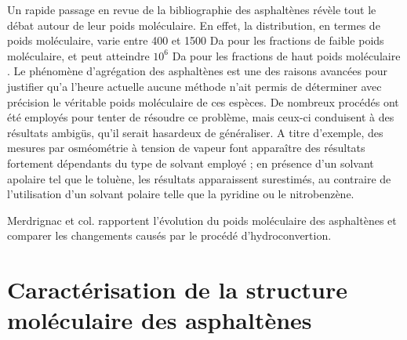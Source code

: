 	Un rapide passage en revue de la bibliographie des asphaltènes révèle tout le débat autour de leur poids moléculaire. En effet, la distribution, en termes de poids moléculaire, varie entre 400 et 1500 Da pour les fractions de faible poids moléculaire, et peut atteindre $10^{6}$ Da pour les fractions de haut poids moléculaire \cite{mullins2008contrasting}. Le phénomène d'agrégation des asphaltènes est une des raisons avancées pour justifier qu'a l'heure actuelle aucune méthode n'ait permis de déterminer avec précision le véritable poids moléculaire de ces espèces. De nombreux procédés ont été employés pour tenter de résoudre ce problème, mais ceux-ci conduisent à des résultats ambigüs, qu'il serait hasardeux de généraliser. A titre d'exemple, des mesures par osméométrie à tension de vapeur font apparaître des résultats fortement dépendants du type de solvant employé ; en présence d'un solvant apolaire tel que le toluène, les résultats apparaissent surestimés, au contraire de l'utilisation d'un solvant polaire telle que la pyridine ou le nitrobenzène. 
	
	
	Merdrignac et col.\cite{merdrignac2006evolution} rapportent l'évolution du poids moléculaire des asphaltènes et comparer les changements causés par le procédé d'hydroconvertion. 
	
	\bigskip
	
	
	\section{Caractérisation de la structure moléculaire des asphaltènes}
	
	
